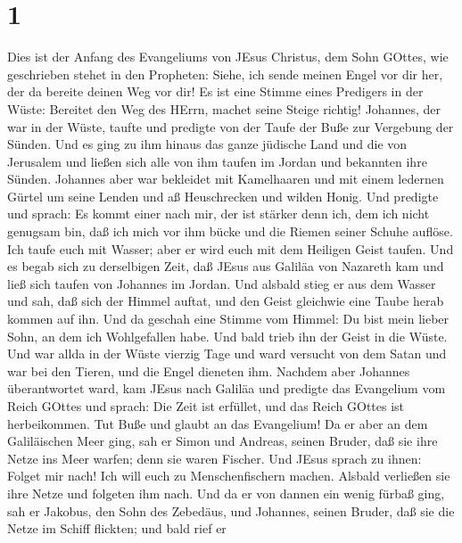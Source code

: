 \hypertarget{section}{%
\section{1}\label{section}}

 Dies ist der Anfang des Evangeliums von JEsus Christus, dem
Sohn GOttes,  wie geschrieben stehet in den Propheten:
Siehe, ich sende meinen Engel vor dir her, der da bereite deinen Weg vor
dir!  Es ist eine Stimme eines Predigers in der Wüste:
Bereitet den Weg des HErrn, machet seine Steige richtig! 
Johannes, der war in der Wüste, taufte und predigte von der Taufe der
Buße zur Vergebung der Sünden.  Und es ging zu ihm hinaus
das ganze jüdische Land und die von Jerusalem und ließen sich alle von
ihm taufen im Jordan und bekannten ihre Sünden.  Johannes
aber war bekleidet mit Kamelhaaren und mit einem ledernen Gürtel um
seine Lenden und aß Heuschrecken und wilden Honig.  Und
predigte und sprach: Es kommt einer nach mir, der ist stärker denn ich,
dem ich nicht genugsam bin, daß ich mich vor ihm bücke und die Riemen
seiner Schuhe auflöse.  Ich taufe euch mit Wasser; aber er
wird euch mit dem Heiligen Geist taufen.  Und es begab sich
zu derselbigen Zeit, daß JEsus aus Galiläa von Nazareth kam und ließ
sich taufen von Johannes im Jordan.  Und alsbald stieg er
aus dem Wasser und sah, daß sich der Himmel auftat, und den Geist
gleichwie eine Taube herab kommen auf ihn.  Und da geschah
eine Stimme vom Himmel: Du bist mein lieber Sohn, an dem ich
Wohlgefallen habe.  Und bald trieb ihn der Geist in die
Wüste.  Und war allda in der Wüste vierzig Tage und ward
versucht von dem Satan und war bei den Tieren, und die Engel dieneten
ihm.  Nachdem aber Johannes überantwortet ward, kam JEsus
nach Galiläa und predigte das Evangelium vom Reich GOttes 
und sprach: Die Zeit ist erfüllet, und das Reich GOttes ist
herbeikommen. Tut Buße und glaubt an das Evangelium!  Da er
aber an dem Galiläischen Meer ging, sah er Simon und Andreas, seinen
Bruder, daß sie ihre Netze ins Meer warfen; denn sie waren Fischer.
 Und JEsus sprach zu ihnen: Folget mir nach! Ich will euch
zu Menschenfischern machen.  Alsbald verließen sie ihre
Netze und folgeten ihm nach.  Und da er von dannen ein
wenig fürbaß ging, sah er Jakobus, den Sohn des Zebedäus, und Johannes,
seinen Bruder, daß sie die Netze im Schiff flickten; und bald rief er
